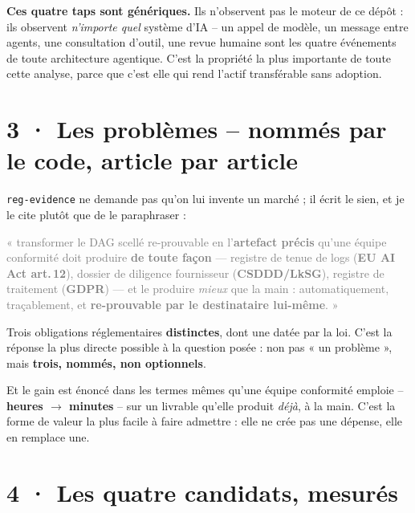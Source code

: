 \documentclass[10pt]{article}
\newcommand{\sz}[1]{\textcolor{grey}{\small\textsf{#1}}}
\newcommand{\code}[1]{\texttt{\small #1}}
\begin{document}
\begin{acquis}
\textbf{Ces quatre taps sont génériques.} Ils n'observent pas le moteur de ce dépôt : ils observent
\emph{n'importe quel} système d'IA -- un appel de modèle, un message entre agents, une consultation
d'outil, une revue humaine sont les quatre événements de toute architecture agentique. C'est la
propriété la plus importante de toute cette analyse, parce que c'est elle qui rend l'actif transférable
sans adoption.
\end{acquis}

\section{3 · Les problèmes -- nommés par le code, article par article}

\code{reg-evidence} ne demande pas qu'on lui invente un marché ; il écrit le sien, et je le cite plutôt
que de le paraphraser :

\begin{extrait}
\sz{« transformer le DAG scellé re-prouvable en l'\textbf{artefact précis} qu'une équipe conformité doit
produire \textbf{de toute façon} --- registre de tenue de logs (\textbf{EU AI Act art.\,12}), dossier de
diligence fournisseur (\textbf{CSDDD/LkSG}), registre de traitement (\textbf{GDPR}) --- et le produire
\emph{mieux} que la main : automatiquement, traçablement, et \textbf{re-prouvable par le destinataire
lui-même}. »}
\end{extrait}

Trois obligations réglementaires \textbf{distinctes}, dont une datée par la loi. C'est la réponse la
plus directe possible à la question posée : non pas « un problème », mais \textbf{trois, nommés, non
optionnels}.

Et le gain est énoncé dans les termes mêmes qu'une équipe conformité emploie -- \textbf{heures
$\rightarrow$ minutes} -- sur un livrable qu'elle produit \emph{déjà}, à la main. C'est la forme de
valeur la plus facile à faire admettre : elle ne crée pas une dépense, elle en remplace une.

\section{4 · Les quatre candidats, mesurés}
\end{document}
